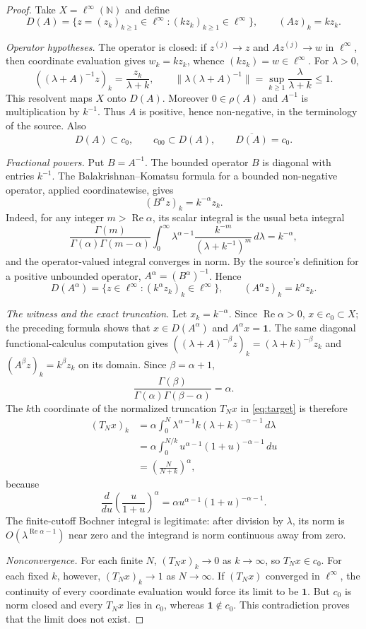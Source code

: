 \documentclass[11pt]{article}
\newcommand{\N}{\mathbb N}
\newcommand{\Lin}{\ell^\infty}
\newcommand{\one}{\mathbf 1}
\DeclareMathOperator{\RePart}{Re}
\begin{document}
\begin{proof}
Take $X=\Lin(\N)$ and define
\[
 D(A)=\{z=(z_k)_{k\ge1}\in\Lin:(kz_k)_{k\ge1}\in\Lin\},
 \qquad (Az)_k=kz_k.
\]

\emph{Operator hypotheses.}
The operator is closed: if $z^{(j)}\to z$ and $Az^{(j)}\to w$ in
$\Lin$, then coordinate evaluation gives $w_k=kz_k$, whence
$(kz_k)=w\in\Lin$.  For $\lambda>0$,
\[
 ((\lambda+A)^{-1}z)_k=\frac{z_k}{\lambda+k},
 \qquad
 \|\lambda(\lambda+A)^{-1}\|
 =\sup_{k\ge1}\frac{\lambda}{\lambda+k}\le1.
\]
This resolvent maps $X$ onto $D(A)$.  Moreover $0\in\rho(A)$ and
$A^{-1}$ is multiplication by $k^{-1}$.  Thus $A$ is positive, hence
non-negative, in the terminology of the source.  Also
\[
 D(A)\subset c_0,
 \qquad c_{00}\subset D(A),
 \qquad \overline{D(A)}=c_0.
\]

\emph{Fractional powers.}
Put $B=A^{-1}$.  The bounded operator $B$ is diagonal with entries $k^{-1}$.
The Balakrishnan--Komatsu formula for a bounded non-negative operator, applied
coordinatewise, gives
\[
 (B^\alpha z)_k=k^{-\alpha}z_k.
\]
Indeed, for any integer $m>\RePart\alpha$, its scalar integral is the usual
beta integral
\[
 \frac{\Gamma(m)}{\Gamma(\alpha)\Gamma(m-\alpha)}
 \int_0^\infty \lambda^{\alpha-1}
 \frac{k^{-m}}{(\lambda+k^{-1})^m}\,d\lambda=k^{-\alpha},
\]
and the operator-valued integral converges in norm.  By the source's
definition for a positive unbounded operator,
$A^\alpha=(B^\alpha)^{-1}$.  Hence
\[
 D(A^\alpha)=\{z\in\Lin:(k^\alpha z_k)_k\in\Lin\},
 \qquad (A^\alpha z)_k=k^\alpha z_k.
\]

\emph{The witness and the exact truncation.}
Let $x_k=k^{-\alpha}$.  Since $\RePart\alpha>0$, $x\in c_0\subset X$;
the preceding formula shows that $x\in D(A^\alpha)$ and
$A^\alpha x=\one$.  The same diagonal functional-calculus computation gives
$((\lambda+A)^{-\beta}z)_k=(\lambda+k)^{-\beta}z_k$ and
$(A^\beta z)_k=k^\beta z_k$ on its domain.  Since
$\beta=\alpha+1$,
\[
 \frac{\Gamma(\beta)}{\Gamma(\alpha)\Gamma(\beta-\alpha)}=\alpha.
\]
The $k$th coordinate of the normalized truncation $T_Nx$ in
\eqref{eq:target} is therefore
\begin{align*}
 (T_Nx)_k
 &=\alpha\int_0^N
   \lambda^{\alpha-1}k(\lambda+k)^{-\alpha-1}\,d\lambda\\
 &=\alpha\int_0^{N/k}u^{\alpha-1}(1+u)^{-\alpha-1}\,du\\
 &=\left(\frac{N}{N+k}\right)^\alpha,
\end{align*}
because
\[
 \frac{d}{du}\left(\frac{u}{1+u}\right)^\alpha
 =\alpha u^{\alpha-1}(1+u)^{-\alpha-1}.
\]
The finite-cutoff Bochner integral is legitimate: after division by
$\lambda$, its norm is $O(\lambda^{\RePart\alpha-1})$ near zero and the
integrand is norm continuous away from zero.

\emph{Nonconvergence.}
For each finite $N$, $(T_Nx)_k\to0$ as $k\to\infty$, so $T_Nx\in c_0$.
For each fixed $k$, however, $(T_Nx)_k\to1$ as $N\to\infty$.  If $(T_Nx)$
converged in $\Lin$, the continuity of every coordinate evaluation would
force its limit to be $\one$.  But $c_0$ is norm closed and every $T_Nx$ lies
in $c_0$, whereas $\one\notin c_0$.  This contradiction proves that the
limit does not exist.
\end{proof}
\end{document}
